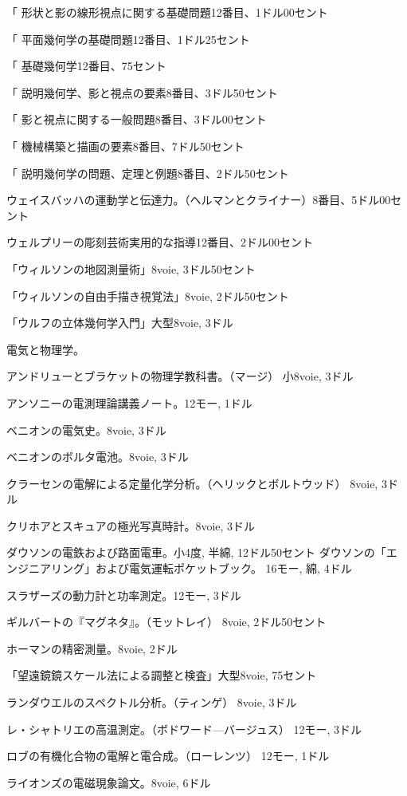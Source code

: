 \documentclass[a4paper,11pt,openany]{ltjsbook}
\begin{document}
「        形状と影の線形視点に関する基礎問題12番目、1ドル00セント

「        平面幾何学の基礎問題12番目、1ドル25セント

「        基礎幾何学12番目、75セント

「        説明幾何学、影と視点の要素8番目、3ドル50セント

「        影と視点に関する一般問題8番目、3ドル00セント

「        機械構築と描画の要素8番目、7ドル50セント

「        説明幾何学の問題、定理と例題8番目、2ドル50セント

ウェイスバッハの運動学と伝達力。（ヘルマンとクライナー）8番目、5ドル00セント

ウェルプリーの彫刻芸術実用的な指導12番目、2ドル00セント

「ウィルソンの地図測量術」8voie, 3ドル50セント

「ウィルソンの自由手描き視覚法」8voie, 2ドル50セント

「ウルフの立体幾何学入門」大型8voie, 3ドル

電気と物理学。

アンドリューとブラケットの物理学教科書。（マージ）
小8voie, 3ドル

アンソニーの電測理論講義ノート。12モー, 1ドル

ベニオンの電気史。8voie, 3ドル

ベニオンのボルタ電池。8voie, 3ドル

クラーセンの電解による定量化学分析。（ヘリックとボルトウッド）
8voie, 3ドル

クリホアとスキュアの極光写真時計。8voie, 3ドル

ダウソンの電鉄および路面電車。小4度, 半綿, 12ドル50セント
ダウソンの「エンジニアリング」および電気運転ポケットブック。
16モー, 綿, 4ドル

スラザーズの動力計と功率測定。12モー, 3ドル

ギルバートの『マグネタ』。（モットレイ）
8voie, 2ドル50セント

ホーマンの精密測量。8voie, 2ドル

「望遠鏡鏡スケール法による調整と検査」大型8voie, 75セント

ランダウエルのスペクトル分析。（ティンゲ）
8voie, 3ドル

レ・シャトリエの高温測定。（ボドワード—バージュス）
12モー, 3ドル

ロブの有機化合物の電解と電合成。（ローレンツ）
12モー, 1ドル

ライオンズの電磁現象論文。8voie, 6ドル
\end{document}
